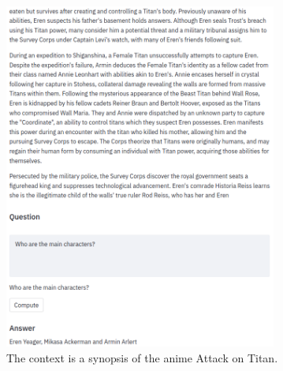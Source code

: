\documentclass[a4paper, 10pt]{article}
\begin{document}
    \begin{figure}[!htb]
        \centering
        \includegraphics[width=0.8\textwidth]{Figures/attack_on_titan.png}
        \caption{The context is a synopsis of the anime Attack on Titan.}
    \end{figure}
    
\end{document}
